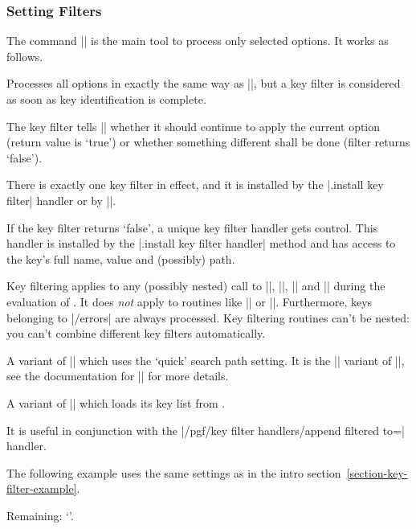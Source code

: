 \subsubsection{Setting Filters}
The command |\pgfkeysfiltered| is the main tool to process only selected options. It works as follows.
\begin{command}{\pgfkeysfiltered{}}
	Processes all options in exactly the same way as |\pgfkeys|, but a key filter is considered as soon as key identification is complete.

	The key filter tells |\pgfkeysfiltered| whether it should continue to apply the current option (return value is `true') or whether something different shall be done (filter returns `false').

	There is exactly one key filter in effect, and it is installed by the |.install key filter| handler or by |\pgfkeysinstallkeyfilter|.

	If the key filter returns `false', a unique key filter handler gets control. This handler is installed by the |.install key filter handler| method and has access to the key's full name, value and (possibly) path.

	Key filtering applies to any (possibly nested) call to |\pgfkeys|, |\pgfkeysalso|, |\pgfqkeys| and |\pgfqkeysalso| during the evaluation of . It does \emph{not} apply to routines like |\pgfkeyssetvalue| or |\pgfkeysgetvalue|. Furthermore, keys belonging to |/errors| are always processed. Key filtering routines can't be nested: you can't combine different key filters automatically.
\end{command}

\begin{command}{\pgfqkeysfiltered{}}
	A variant of |\pgfkeysfiltered| which uses the `quick' search path setting. It is the |\pgfqkeys| variant of |\pgfkeysfiltered|, see the documentation for |\pgfqkeys| for more details.
\end{command}

\begin{command}{\pgfkeysalsofrom{}}
	A variant of |\pgfkeysalso| which loads its key list from .

	It is useful in conjunction with the |/pgf/key filter handlers/append filtered to=| handler.

	The following example uses the same settings as in the intro section~\ref{section-key-filter-example}.
\begin{codeexample}[]
\def\remainingoptions{}

Remaining: `\remainingoptions'.
\pgfkeysalsofrom{\remainingoptions}
\end{codeexample}
\end{command}


